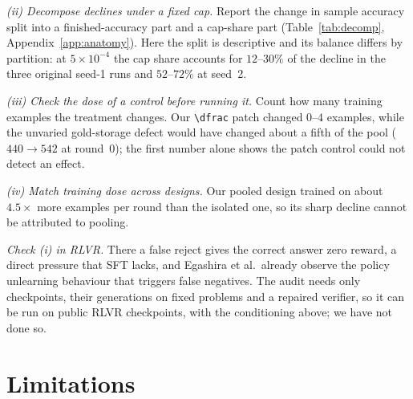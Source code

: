 \documentclass[runningheads]{llncs}
\begin{document}
\emph{(ii) Decompose declines under a fixed cap.} Report the change in sample
accuracy split into a finished-accuracy part and a cap-share part
(Table~\ref{tab:decomp}, Appendix~\ref{app:anatomy}). Here the split is descriptive and its balance
differs by partition: at $5\times10^{-4}$ the cap share accounts for
$12$--$30\%$ of the decline in the three original seed-1 runs and $52$--$72\%$
at seed~2.

\emph{(iii) Check the dose of a control before running it.} Count how many
training examples the treatment changes. Our \verb|\dfrac| patch changed $0$--$4$
examples, while the unvaried gold-storage defect would have changed about a
fifth of the pool ($440\to542$ at round~0); the first number alone shows the
patch control could not detect an effect.

\emph{(iv) Match training dose across designs.} Our pooled design trained on
about $4.5\times$ more examples per round than the isolated one, so its sharp
decline cannot be attributed to pooling.

\emph{Check (i) in RLVR.} There a false reject gives the correct answer zero
reward, a direct pressure that SFT lacks, and Egashira et al.\ already
observe the policy unlearning behaviour that triggers false negatives. The
audit needs only checkpoints, their generations on fixed problems and a
repaired verifier, so it can be run on public RLVR checkpoints, with the
conditioning above; we have not done so.

\section{Limitations}
\label{sec:limitations}
\end{document}
